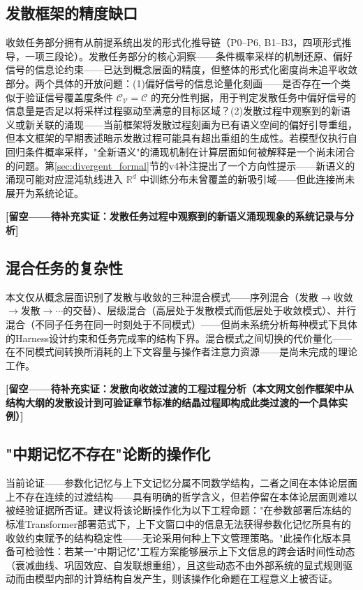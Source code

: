 \documentclass[11pt,a4paper]{article}
\theoremstyle{definition}
\newcommand{\verifspace}{\mathcal{C}_{\mathcal{V}}}
\newcommand{\taskcspace}{\mathcal{C}}
\begin{document}
\subsection{发散框架的精度缺口}

收敛任务部分拥有从前提系统出发的形式化推导链（P0--P6, B1--B3，四项形式推导，一项三段论）。发散任务部分的核心洞察——条件概率采样的机制还原、偏好信号的信息论约束——已达到概念层面的精度，但整体的形式化密度尚未追平收敛部分。两个具体的开放问题：(1)偏好信号的信息论量化刻画——是否存在一个类似于验证信号覆盖度条件 $\verifspace = \taskcspace$ 的充分性判据，用于判定发散任务中偏好信号的信息量是否足以将采样过程驱动至满意的目标区域？(2)发散过程中观察到的新语义或新关联的涌现——当前框架将发散过程刻画为已有语义空间的偏好引导重组，但本文框架的早期表述暗示发散过程可能具有超出重组的生成性。若模型仅执行自回归条件概率采样，"全新语义"的涌现机制在计算层面如何被解释是一个尚未闭合的问题。第\ref{sec:divergent_formal}节的v4补注提出了一个方向性提示——新语义的涌现可能对应混沌轨线进入 $\mathbb{R}^d$ 中训练分布未曾覆盖的新吸引域——但此连接尚未展开为系统论证。

\textbf{[留空——待补充实证：发散任务过程中观察到的新语义涌现现象的系统记录与分析]}

\subsection{混合任务的复杂性}

本文仅从概念层面识别了发散与收敛的三种混合模式——序列混合（发散$\to$收敛$\to$发散$\to\cdots$的交替）、层级混合（高层处于发散模式而低层处于收敛模式）、并行混合（不同子任务在同一时刻处于不同模式）——但尚未系统分析每种模式下具体的Harness设计约束和任务完成率的结构下界。混合模式之间切换的代价量化——在不同模式间转换所消耗的上下文容量与操作者注意力资源——是尚未完成的理论工作。

\textbf{[留空——待补充实证：发散向收敛过渡的工程过程分析（本文网文创作框架中从结构大纲的发散设计到可验证章节标准的结晶过程即构成此类过渡的一个具体实例）]}

\subsection{"中期记忆不存在"论断的操作化}

当前论证——参数化记忆与上下文记忆分属不同数学结构，二者之间在本体论层面上不存在连续的过渡结构——具有明确的哲学含义，但若停留在本体论层面则难以被经验证据所否证。建议将该论断操作化为以下工程命题："在参数部署后冻结的标准Transformer部署范式下，上下文窗口中的信息无法获得参数化记忆所具有的收敛约束赋予的结构稳定性——无论采用何种上下文管理策略。"此操作化版本具备可检验性：若某一"中期记忆"工程方案能够展示上下文信息的跨会话时间性动态（衰减曲线、巩固效应、自发联想重组），且这些动态不由外部系统的显式规则驱动而由模型内部的计算结构自发产生，则该操作化命题在工程意义上被否证。
\end{document}
